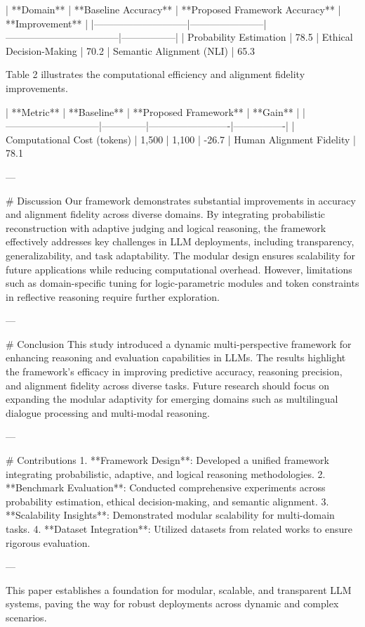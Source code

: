 | **Domain**                  | **Baseline Accuracy** | **Proposed Framework Accuracy** | **Improvement** |
|-----------------------------|-----------------------|-----------------------------------|-----------------|
| Probability Estimation      | 78.5%
| Ethical Decision-Making     | 70.2%
| Semantic Alignment (NLI)    | 65.3%

Table 2 illustrates the computational efficiency and alignment fidelity improvements.

| **Metric**                  | **Baseline** | **Proposed Framework** | **Gain**       |
|-----------------------------|--------------|-------------------------|----------------|
| Computational Cost (tokens) | 1,500        | 1,100                   | -26.7%
| Human Alignment Fidelity    | 78.1%

---

# Discussion  
Our framework demonstrates substantial improvements in accuracy and alignment fidelity across diverse domains. By integrating probabilistic reconstruction with adaptive judging and logical reasoning, the framework effectively addresses key challenges in LLM deployments, including transparency, generalizability, and task adaptability. The modular design ensures scalability for future applications while reducing computational overhead. However, limitations such as domain-specific tuning for logic-parametric modules and token constraints in reflective reasoning require further exploration.

---

# Conclusion  
This study introduced a dynamic multi-perspective framework for enhancing reasoning and evaluation capabilities in LLMs. The results highlight the framework's efficacy in improving predictive accuracy, reasoning precision, and alignment fidelity across diverse tasks. Future research should focus on expanding the modular adaptivity for emerging domains such as multilingual dialogue processing and multi-modal reasoning.

---

# Contributions  
1. **Framework Design**: Developed a unified framework integrating probabilistic, adaptive, and logical reasoning methodologies.  
2. **Benchmark Evaluation**: Conducted comprehensive experiments across probability estimation, ethical decision-making, and semantic alignment.  
3. **Scalability Insights**: Demonstrated modular scalability for multi-domain tasks.  
4. **Dataset Integration**: Utilized datasets from related works to ensure rigorous evaluation.

--- 

This paper establishes a foundation for modular, scalable, and transparent LLM systems, paving the way for robust deployments across dynamic and complex scenarios.